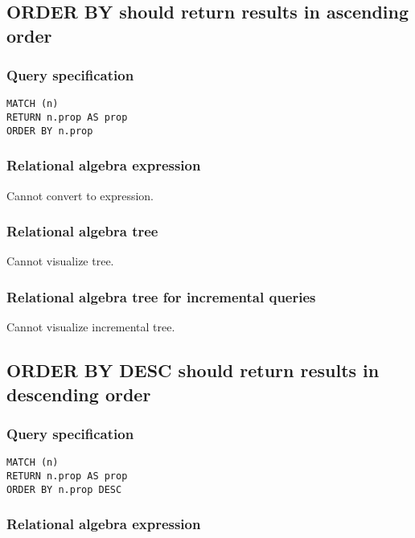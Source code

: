 \subsection{ORDER BY should return results in ascending order}

\subsubsection*{Query specification}

\begin{lstlisting}
MATCH (n)
RETURN n.prop AS prop
ORDER BY n.prop
\end{lstlisting}

\subsubsection*{Relational algebra expression}

Cannot convert to expression.

\subsubsection*{Relational algebra tree}

Cannot visualize tree.

\subsubsection*{Relational algebra tree for incremental queries}

Cannot visualize incremental tree.

\subsection{ORDER BY DESC should return results in descending order}

\subsubsection*{Query specification}

\begin{lstlisting}
MATCH (n)
RETURN n.prop AS prop
ORDER BY n.prop DESC
\end{lstlisting}

\subsubsection*{Relational algebra expression}

